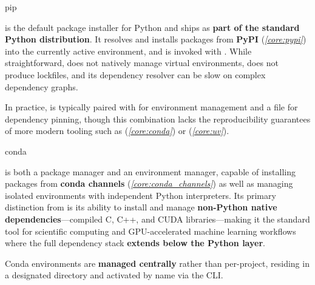 \documentclass[10pt]{article}
\begin{document}
    \begin{core}{pip}

       is the default package installer for Python and ships as \textbf{part of the standard Python distribution}. It resolves and installs packages from \textbf{PyPI} (\textit{\autoref{core:pypi}}) into the currently active environment, and is invoked with . While straightforward,  does not natively manage virtual environments, does not produce lockfiles, and its dependency resolver can be slow on complex dependency graphs. 

      In practice,  is typically paired with  for environment management and a  file for dependency pinning, though this combination lacks the reproducibility guarantees of more modern tooling such as  (\textit{\autoref{core:conda}}) or  (\textit{\autoref{core:uv}}).

    \end{core}

    \begin{core}[label=core:conda]{conda}

       is both a package manager and an environment manager, capable of installing packages from \textbf{conda channels} (\textit{\autoref{core:conda_channels}}) as well as managing isolated environments with independent Python interpreters. Its primary distinction from  is its ability to install and manage \textbf{non-Python native dependencies}---compiled C, C++, and CUDA libraries---making it the standard tool for scientific computing and GPU-accelerated machine learning workflows where the full dependency stack \textbf{extends below the Python layer}.

      Conda environments are \textbf{managed centrally} rather than per-project, residing in a designated  directory and activated by name via the CLI. 

    \end{core}
\end{document}
